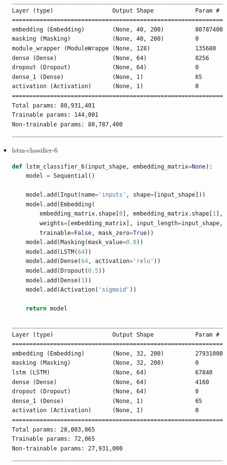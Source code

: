 \documentclass{article}
\begin{document}
\begin{itemize}
\begin{lstlisting}[numbers=none, caption=Обобщение на lstm-classifier-5.]
_____________________________________________________________
Layer (type)                 Output Shape            Param #
=============================================================
embedding (Embedding)        (None, 40, 200)         80787400
masking (Masking)            (None, 40, 200)         0
module_wrapper (ModuleWrappe (None, 128)             135680
dense (Dense)                (None, 64)              8256
dropout (Dropout)            (None, 64)              0
dense_1 (Dense)              (None, 1)               65
activation (Activation)      (None, 1)               0
=============================================================
Total params: 80,931,401
Trainable params: 144,001
Non-trainable params: 80,787,400
_____________________________________________________________
\end{lstlisting}

  \item lstm-classifier-6

\begin{lstlisting}[language=Python, caption=Дефиниция на lstm-classifier-6.]
def lstm_classifier_6(input_shape, embedding_matrix=None):
    model = Sequential()

    model.add(Input(name='inputs', shape=[input_shape]))
    model.add(Embedding(
        embedding_matrix.shape[0], embedding_matrix.shape[1],
        weights=[embedding_matrix], input_length=input_shape,
        trainable=False, mask_zero=True))
    model.add(Masking(mask_value=0.0))
    model.add(LSTM(64))
    model.add(Dense(64, activation='relu'))
    model.add(Dropout(0.5))
    model.add(Dense(1))
    model.add(Activation('sigmoid'))

    return model
\end{lstlisting}

\begin{lstlisting}[numbers=none, caption=Обобщение на lstm-classifier-6.]
_____________________________________________________________
Layer (type)                 Output Shape            Param #
=============================================================
embedding (Embedding)        (None, 32, 200)         27931000
masking (Masking)            (None, 32, 200)         0
lstm (LSTM)                  (None, 64)              67840
dense (Dense)                (None, 64)              4160
dropout (Dropout)            (None, 64)              0
dense_1 (Dense)              (None, 1)               65
activation (Activation)      (None, 1)               0
=============================================================
Total params: 28,003,065
Trainable params: 72,065
Non-trainable params: 27,931,000
_____________________________________________________________
\end{lstlisting}


\end{itemize}
\end{document}
